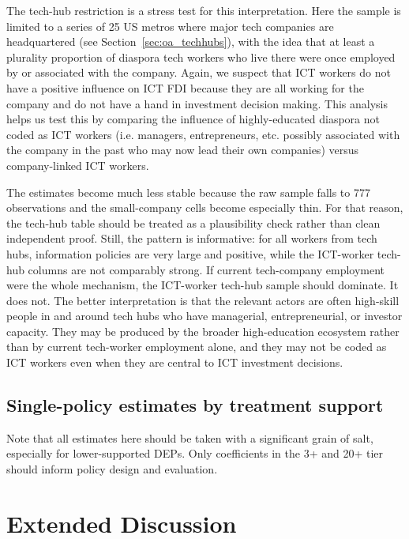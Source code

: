 \documentclass[12pt]{article}
\let\oldsection\section
\renewcommand{\section}{\FloatBarrier\oldsection}
\let\oldsubsection\subsection
\renewcommand{\subsection}{\FloatBarrier\oldsubsection}
\begin{document}
The tech-hub restriction is a stress test for this interpretation. Here the sample is limited to a series of 25 US metros where major tech companies are headquartered (see Section~\ref{sec:oa_techhubs}), with the idea that at least a plurality proportion of diaspora tech workers who live there were once employed by or associated with the company. Again, we suspect that ICT workers do not have a positive influence on ICT FDI because they are all working for the company and do not have a hand in investment decision making. This analysis helps us test this by comparing the influence of highly-educated diaspora not coded as ICT workers (i.e. managers, entrepreneurs, etc. possibly associated with the company in the past who may now lead their own companies) versus company-linked ICT workers.

The estimates become much less stable because the raw sample falls to 777 observations and the small-company cells become especially thin. For that reason, the tech-hub table should be treated as a plausibility check rather than clean independent proof. Still, the pattern is informative: for all workers from tech hubs, information policies are very large and positive, while the ICT-worker tech-hub columns are not comparably strong. If current tech-company employment were the whole mechanism, the ICT-worker tech-hub sample should dominate. It does not. The better interpretation is that the relevant actors are often high-skill people in and around tech hubs who have managerial, entrepreneurial, or investor capacity. They may be produced by the broader high-education ecosystem rather than by current tech-worker employment alone, and they may not be coded as ICT workers even when they are central to ICT investment decisions.

\subsection{Single-policy estimates by treatment support}

Note that all estimates here should be taken with a significant grain of salt, especially for lower-supported DEPs. Only coefficients in the 3+ and 20+ tier should inform policy design and evaluation.

\begingroup
\footnotesize
{}


\endgroup

\section{Extended Discussion} \label{sec:oa_discussion}
\end{document}
